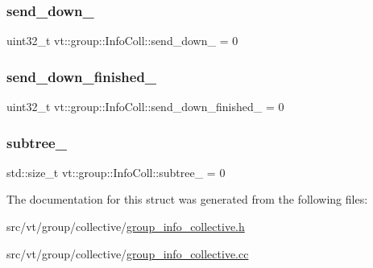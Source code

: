 \subsubsection{\texorpdfstring{send\+\_\+down\+\_\+}{send\_down\_}}
{\footnotesize\ttfamily uint32\+\_\+t vt\+::group\+::\+Info\+Coll\+::send\+\_\+down\+\_\+ = 0\hspace{0.3cm}{\ttfamily [protected]}}

\mbox{\label{structvt_1_1group_1_1_info_coll_ab550c62eb0f12b06332058ef0ac6b2fd}} 
\subsubsection{\texorpdfstring{send\+\_\+down\+\_\+finished\+\_\+}{send\_down\_finished\_}}
{\footnotesize\ttfamily uint32\+\_\+t vt\+::group\+::\+Info\+Coll\+::send\+\_\+down\+\_\+finished\+\_\+ = 0\hspace{0.3cm}{\ttfamily [protected]}}

\mbox{\label{structvt_1_1group_1_1_info_coll_a42a225abb3f2d734ae4eddaecdb56b9e}} 
\subsubsection{\texorpdfstring{subtree\+\_\+}{subtree\_}}
{\footnotesize\ttfamily std\+::size\+\_\+t vt\+::group\+::\+Info\+Coll\+::subtree\+\_\+ = 0\hspace{0.3cm}{\ttfamily [protected]}}



The documentation for this struct was generated from the following files\+:\begin{DoxyCompactItemize}
\item 
src/vt/group/collective/\hyperlink{group__info__collective_8h}{group\+\_\+info\+\_\+collective.\+h}\item 
src/vt/group/collective/\hyperlink{group__info__collective_8cc}{group\+\_\+info\+\_\+collective.\+cc}\end{DoxyCompactItemize}
